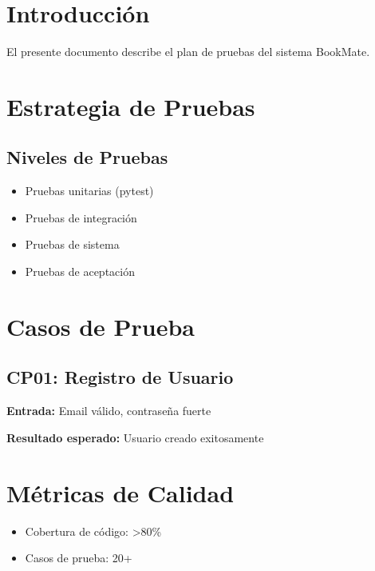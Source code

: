 
\def\docTitle{Plan de Pruebas}
\def\docSubtitle{Estrategia y Casos de Prueba}
\def\docWeek{16}
\def\docVersion{1.0}





\makeUNIcover
\versionTable
\tableofcontents
\newpage

\section{Introducción}

El presente documento describe el plan de pruebas del sistema BookMate.

\section{Estrategia de Pruebas}

\subsection{Niveles de Pruebas}
\begin{itemize}
    \item Pruebas unitarias (pytest)
    \item Pruebas de integración
    \item Pruebas de sistema
    \item Pruebas de aceptación
\end{itemize}

\section{Casos de Prueba}

\subsection{CP01: Registro de Usuario}

\textbf{Entrada:} Email válido, contraseña fuerte

\textbf{Resultado esperado:} Usuario creado exitosamente

\section{Métricas de Calidad}

\begin{itemize}
    \item Cobertura de código: >80\%
    \item Casos de prueba: 20+
\end{itemize}

\printbibliography[heading=bibintoc,title={Referencias}]



